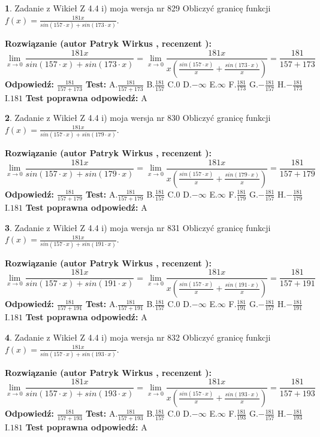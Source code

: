 \documentclass[12pt, a4paper]{article}
\theoremstyle{definition} %
\newtheorem{zad}{}
\newcommand{\zadStart}[1]{\begin{zad}#1\newline}
\newcommand{\zadStop}{\end{zad}}
\newcommand{\rozwStart}[2]{\noindent \textbf{Rozwiązanie (autor #1 , recenzent #2): }\newline}
\newcommand{\rozwStop}{\newline}
\newcommand{\odpStart}{\noindent \textbf{Odpowiedź:}\newline}
\newcommand{\odpStop}{\newline}
\newcommand{\testStart}{\noindent \textbf{Test:}\newline}
\newcommand{\testStop}{\newline}
\newcommand{\kluczStart}{\noindent \textbf{Test poprawna odpowiedź:}\newline}
\newcommand{\kluczStop}{\newline}
\begin{document}
\zadStart{Zadanie z Wikieł Z 4.4 i) moja wersja nr 829}
Obliczyć granicę funkcji $f(x)=\frac{181x}{sin(157\cdot x) +sin(173\cdot x)}$.
\zadStop
\rozwStart{Patryk Wirkus}{}
$$\lim\limits_{x\to 0}\frac{181x}{sin(157\cdot x) +sin(173\cdot x)}=\lim\limits_{x\to 0}\frac{181x}{x(\frac{sin(157\cdot x)}{x}+\frac{sin(173\cdot x)}{x})}=\frac{181}{157+173}$$
\rozwStop
\odpStart
$\frac{181}{157+173}$
\odpStop
\testStart
A.$\frac{181}{157+173}$
B.$\frac{181}{157}$
C.$0$
D.$-\infty$
E.$\infty$
F.$\frac{181}{173}$
G.$-\frac{181}{157}$
H.$-\frac{181}{173}$
I.$181$
\testStop
\kluczStart
A
\kluczStop



\zadStart{Zadanie z Wikieł Z 4.4 i) moja wersja nr 830}
Obliczyć granicę funkcji $f(x)=\frac{181x}{sin(157\cdot x) +sin(179\cdot x)}$.
\zadStop
\rozwStart{Patryk Wirkus}{}
$$\lim\limits_{x\to 0}\frac{181x}{sin(157\cdot x) +sin(179\cdot x)}=\lim\limits_{x\to 0}\frac{181x}{x(\frac{sin(157\cdot x)}{x}+\frac{sin(179\cdot x)}{x})}=\frac{181}{157+179}$$
\rozwStop
\odpStart
$\frac{181}{157+179}$
\odpStop
\testStart
A.$\frac{181}{157+179}$
B.$\frac{181}{157}$
C.$0$
D.$-\infty$
E.$\infty$
F.$\frac{181}{179}$
G.$-\frac{181}{157}$
H.$-\frac{181}{179}$
I.$181$
\testStop
\kluczStart
A
\kluczStop



\zadStart{Zadanie z Wikieł Z 4.4 i) moja wersja nr 831}
Obliczyć granicę funkcji $f(x)=\frac{181x}{sin(157\cdot x) +sin(191\cdot x)}$.
\zadStop
\rozwStart{Patryk Wirkus}{}
$$\lim\limits_{x\to 0}\frac{181x}{sin(157\cdot x) +sin(191\cdot x)}=\lim\limits_{x\to 0}\frac{181x}{x(\frac{sin(157\cdot x)}{x}+\frac{sin(191\cdot x)}{x})}=\frac{181}{157+191}$$
\rozwStop
\odpStart
$\frac{181}{157+191}$
\odpStop
\testStart
A.$\frac{181}{157+191}$
B.$\frac{181}{157}$
C.$0$
D.$-\infty$
E.$\infty$
F.$\frac{181}{191}$
G.$-\frac{181}{157}$
H.$-\frac{181}{191}$
I.$181$
\testStop
\kluczStart
A
\kluczStop



\zadStart{Zadanie z Wikieł Z 4.4 i) moja wersja nr 832}
Obliczyć granicę funkcji $f(x)=\frac{181x}{sin(157\cdot x) +sin(193\cdot x)}$.
\zadStop
\rozwStart{Patryk Wirkus}{}
$$\lim\limits_{x\to 0}\frac{181x}{sin(157\cdot x) +sin(193\cdot x)}=\lim\limits_{x\to 0}\frac{181x}{x(\frac{sin(157\cdot x)}{x}+\frac{sin(193\cdot x)}{x})}=\frac{181}{157+193}$$
\rozwStop
\odpStart
$\frac{181}{157+193}$
\odpStop
\testStart
A.$\frac{181}{157+193}$
B.$\frac{181}{157}$
C.$0$
D.$-\infty$
E.$\infty$
F.$\frac{181}{193}$
G.$-\frac{181}{157}$
H.$-\frac{181}{193}$
I.$181$
\testStop
\kluczStart
A
\kluczStop
\end{document}
